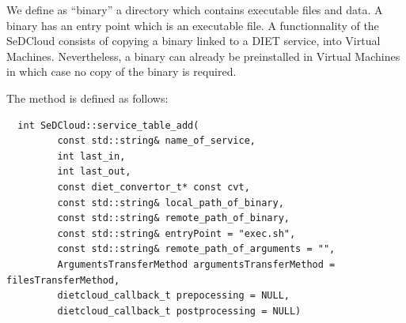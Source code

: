 We define as ``binary'' a directory which contains executable files
and data. A binary has an entry point which is an executable file.  A
functionnality of the SeDCloud consists of copying a binary linked to
a DIET service, into Virtual Machines. Nevertheless, a binary can
already be preinstalled in Virtual Machines in which case no copy of
the binary is required. 

The method is defined as follows:

\begin{verbatim}
  int SeDCloud::service_table_add(
         const std::string& name_of_service,
         int last_in,
         int last_out,
         const diet_convertor_t* const cvt,
         const std::string& local_path_of_binary,
         const std::string& remote_path_of_binary,
         const std::string& entryPoint = "exec.sh",
         const std::string& remote_path_of_arguments = "",
         ArgumentsTransferMethod argumentsTransferMethod = filesTransferMethod,
         dietcloud_callback_t prepocessing = NULL,
         dietcloud_callback_t postprocessing = NULL)
\end{verbatim}

